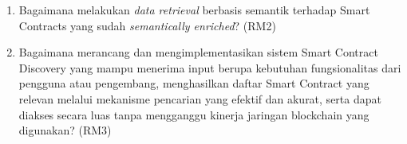 \begin{enumerate}
  \item Bagaimana melakukan \textit{data retrieval} berbasis semantik terhadap Smart Contracts yang sudah \textit{semantically enriched}? (RM2)

  \item Bagaimana merancang dan mengimplementasikan sistem Smart Contract Discovery yang mampu menerima input berupa kebutuhan fungsionalitas dari pengguna atau pengembang, menghasilkan daftar Smart Contract yang relevan melalui mekanisme pencarian yang efektif dan akurat, serta dapat diakses secara luas tanpa mengganggu kinerja jaringan blockchain yang digunakan? (RM3)

  

\end{enumerate}



